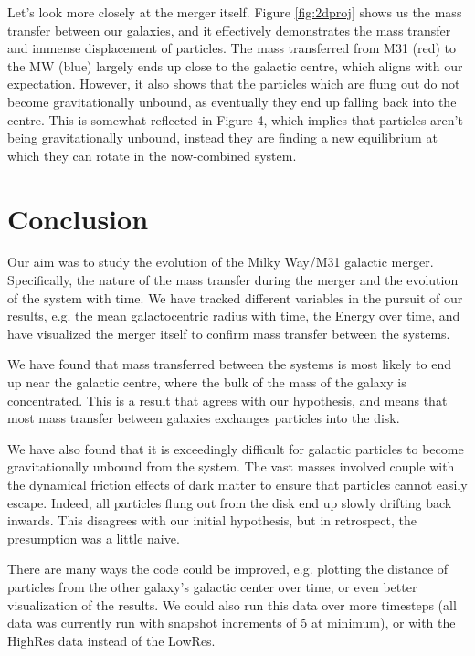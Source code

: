 \documentclass[linenumbers, ]{aastex631}
\begin{document}
Let's look more closely at the merger itself. Figure \ref{fig:2dproj}
shows us the mass transfer between our galaxies, and it effectively demonstrates the mass transfer and immense displacement of particles. The mass transferred from M31 (red) to the MW (blue) largely ends up close to the galactic centre, which aligns with our expectation. However, it also shows that the particles which are flung out do not become gravitationally unbound, as eventually they end up falling back into the centre. This is somewhat reflected in Figure 4, which implies that particles aren't being gravitationally unbound, instead they are finding a new equilibrium at which they can rotate in the now-combined system.


\section{Conclusion}

Our aim was to study the evolution of the Milky Way/M31 galactic merger. Specifically, the nature of the mass transfer during the merger and the evolution of the system with time. We have tracked different variables in the pursuit of our results, e.g. the mean galactocentric radius with time, the Energy over time, and have visualized the merger itself to confirm mass transfer between the systems.

We have found that mass transferred between the systems is most likely to end up near the galactic centre, where the bulk of the mass of the galaxy is concentrated. This is a result that agrees with our hypothesis, and means that most mass transfer between galaxies exchanges particles into the disk.

We have also found that it is exceedingly difficult for galactic particles to become gravitationally unbound from the system. The vast masses involved couple with the dynamical friction effects of dark matter to ensure that particles cannot easily escape. Indeed, all particles flung out from the disk end up slowly drifting back inwards. This disagrees with our initial hypothesis, but in retrospect, the presumption was a little naive. 


There are many ways the code could be improved, e.g. plotting the distance of particles from the other galaxy's galactic center over time, or even better visualization of the results. We could also run this data over more timesteps (all data was currently run with snapshot increments of 5 at minimum), or with the HighRes data instead of the LowRes.
\end{document}
